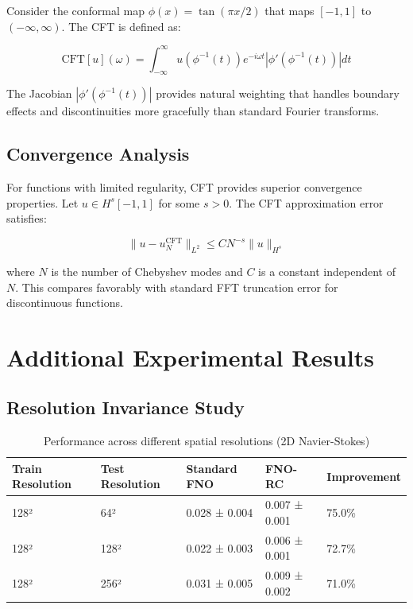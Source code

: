 \documentclass[11pt]{article}
\begin{document}
{{{Consider the conformal map $\phi(x) = \tan(\pi x/2)$ that maps $[-1,1]$ to $(-\infty,\infty)$. The CFT is defined as:

\begin{equation}
\text{CFT}[u](\omega) = \int_{-\infty}^{\infty} u(\phi^{-1}(t)) e^{-i\omega t} |\phi'(\phi^{-1}(t))| dt
\end{equation}

The Jacobian $|\phi'(\phi^{-1}(t))|$ provides natural weighting that handles boundary effects and discontinuities more gracefully than standard Fourier transforms.

\subsection{Convergence Analysis}

For functions with limited regularity, CFT provides superior convergence properties. Let $u \in H^s[-1,1]$ for some $s > 0$. The CFT approximation error satisfies:

\begin{equation}
\|u - u_N^{\text{CFT}}\|_{L^2} \leq C N^{-s} \|u\|_{H^s}
\end{equation}

where $N$ is the number of Chebyshev modes and $C$ is a constant independent of $N$. This compares favorably with standard FFT truncation error for discontinuous functions.

\section{Additional Experimental Results}

\subsection{Resolution Invariance Study}

\begin{table}[h]
\centering
\caption{Performance across different spatial resolutions (2D Navier-Stokes)}
\label{tab:resolution}
\small
\begin{tabular}{@{}p{2cm}p{2cm}p{2cm}p{2cm}p{2cm}@{}}
\toprule
\textbf{Train Resolution} & \textbf{Test Resolution} & \textbf{Standard FNO} & \textbf{FNO-RC} & \textbf{Improvement} \\
\midrule
128² & 64² & 0.028 ± 0.004 & 0.007 ± 0.001 & 75.0\% \\
128² & 128² & 0.022 ± 0.003 & 0.006 ± 0.001 & 72.7\% \\
128² & 256² & 0.031 ± 0.005 & 0.009 ± 0.002 & 71.0\% \\
\bottomrule
\end{tabular}
\end{table}

}}}
\end{document}
